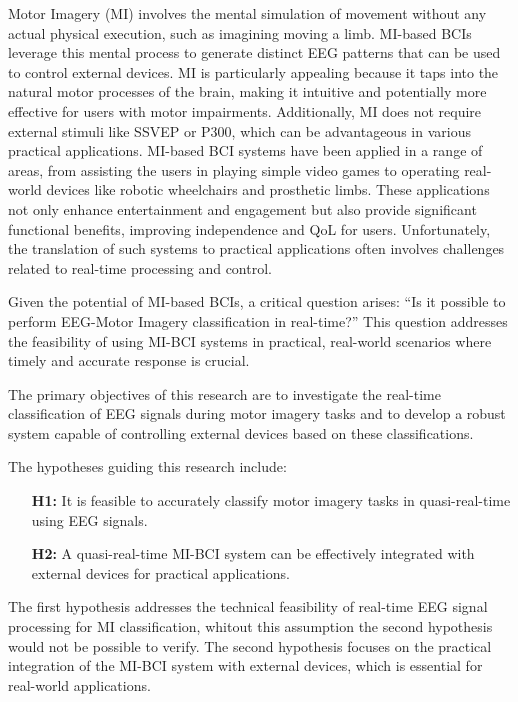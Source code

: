 Motor Imagery (MI) involves the mental simulation of movement without any actual physical execution, such as imagining moving a limb. 
MI-based BCIs leverage this mental process to generate distinct EEG patterns that can be used to control external devices. 
MI is particularly appealing because it taps into the natural motor processes of the brain, making it intuitive and potentially more effective for users with motor impairments. 
Additionally, MI does not require external stimuli like SSVEP or P300, which can be advantageous in various practical applications.
MI-based BCI systems have been applied in a range of areas, from assisting the users in playing simple video games to operating real-world devices like robotic wheelchairs and prosthetic limbs.
These applications not only enhance entertainment and engagement but also provide significant functional benefits, improving independence and QoL for users.
Unfortunately, the translation of such systems to practical applications often involves challenges related to real-time processing and control.

Given the potential of MI-based BCIs, a critical question arises: ``Is it possible to perform EEG-Motor Imagery classification in real-time?'' 
This question addresses the feasibility of using MI-BCI systems in practical, real-world scenarios where timely and accurate response is crucial.

The primary objectives of this research are to investigate the real-time classification of EEG signals during motor imagery tasks and to develop a robust system capable of controlling external devices based on these classifications. 

The hypotheses guiding this research include:
\begin{itemize}
    \item[\textbf{H1:}] It is feasible to accurately classify motor imagery tasks in quasi-real-time using EEG signals.
    \item[\textbf{H2:}] A quasi-real-time MI-BCI system can be effectively integrated with external devices for practical applications.
\end{itemize}

The first hypothesis addresses the technical feasibility of real-time EEG signal processing for MI classification, whitout this assumption the second hypothesis would not be possible to verify.
The second hypothesis focuses on the practical integration of the MI-BCI system with external devices, which is essential for real-world applications.

